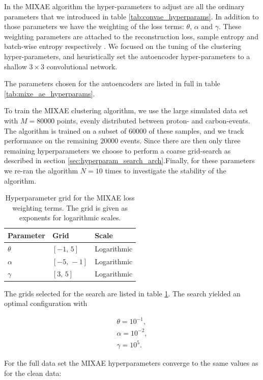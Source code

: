 \documentclass[review,number,sort&compress]{elsarticle}
\begin{document}
In the MIXAE algorithm the hyper-parameters to adjust are all the ordinary parameters that we introduced in table \ref{tab:convae_hyperparams}. In addition to those parameters we have the weighting of the loss terms: $\theta$, $\alpha$ and $\gamma$. These weighting parameters are attached to the reconstruction loss, sample entropy and batch-wise entropy respectively \cite{Zhang}. 
We focused on the tuning of the clustering hyper-parameters, and heuristically set the autoencoder hyper-parameters to a shallow $3\times3$ convolutional network.  

The parameters chosen for the autoencoders are listed in full in table \ref{tab:mixe_ae_hyperparams}.

To train the MIXAE clustering algorithm, we use the large simulated data set with $M=80000$ points, evenly distributed between proton- and carbon-events. The algorithm is trained on a subset of $60000$ of these samples, and we track performance on the remaining $20000$ events. Since there are then only three remaining hyperparameters we choose to perform a coarse grid-search as described in section \ref{sec:hyperparam_search_arch}.Finally, for these parameters we re-ran the algorithm $N=10$ times to investigate the stability of the algorithm.

\begin{table}
\centering
\caption{Hyperparameter grid for the MIXAE loss weighting terms. The grid is given as exponents for logarithmic scales.}\label{tab:mixae_loss_weights}
\begin{tabular}{lll}
\toprule
Parameter & Grid & Scale \\
\midrule 
$\theta$ & $[-1,\, 5]$ & Logarithmic \\
$\alpha$ & $[-5,\, -1]$ & Logarithmic \\
$\gamma$ & $[3,\, 5]$ & Logarithmic
\end{tabular}
\end{table}

The grids selected for the search are listed in table \ref{tab:mixae_loss_weights}. The search yielded an optimal configuration with 

\begin{align}
\theta = 10^{-1}, \\
\alpha = 10^{-2}, \\
\gamma = 10^5.
\end{align}

For the full data set the MIXAE hyperparameters converge to the same values as for the clean data:
\end{document}
